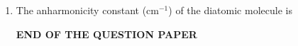 \documentclass[12pt]{article}
\begin{document}
\begin{enumerate}
\item  The anharmonicity constant (cm$^{-1}$) of the diatomic molecule is
\begin{enumerate}
   \hfill{}
\end{enumerate}

\begin{center}
\textbf{END OF THE QUESTION PAPER}
\end{center}

\end{enumerate}
\end{document}
